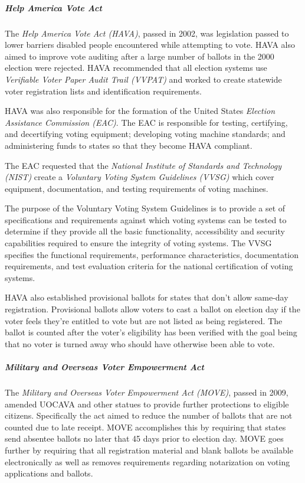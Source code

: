 \subparagraph{Help America Vote Act}
The \emph{Help America Vote Act (HAVA)}, passed in 2002, was legislation passed to
lower barriers disabled people encountered while attempting to vote. HAVA also
aimed to improve vote auditing after a large number of ballots in the 2000
election were rejected. HAVA recommended that all election systems use
\emph{Verifiable Voter Paper Audit Trail (VVPAT)} and worked to create statewide
voter registration lists and identification requirements.

HAVA was also responsible for the formation of the United States \emph{Election
Assistance Commission (EAC)}. The EAC is responsible for testing, certifying,
and decertifying voting equipment; developing voting machine standards; and
administering funds to states so that they become HAVA compliant.

The EAC requested that the \emph{National Institute of Standards and Technology
(NIST)} create a \emph{Voluntary Voting System Guidelines (VVSG)} which cover
equipment, documentation, and testing requirements of voting machines.

\begin{displayquote}
  The purpose of the Voluntary Voting System Guidelines is to provide a set of
  specifications and requirements against which voting systems can be tested to
  determine if they provide all the basic functionality, accessibility and
  security capabilities required to ensure the integrity of voting systems. The
  VVSG specifies the functional requirements, performance characteristics,
  documentation requirements, and test evaluation criteria for the national
  certification of voting systems.
\end{displayquote}

HAVA also established provisional ballots for states that don't allow same-day
registration. Provisional ballots allow voters to cast a ballot on election day
if the voter feels they're entitled to vote but are not listed as being
registered. The ballot is counted after the voter's eligibility has been
verified with the goal being that no voter is turned away who should have
otherwise been able to vote.

\subparagraph{Military and Overseas Voter Empowerment Act}
The \emph{Military and Overseas Voter Empowerment Act (MOVE)}, passed in 2009,
amended UOCAVA and other statues to provide further protections to eligible
citizens. Specifically the act aimed to reduce the number of ballots that are
not counted due to late receipt. MOVE accomplishes this by requiring that states
send absentee ballots no later that 45 days prior to election day. MOVE goes
further by requiring that all registration material and blank ballots be
available electronically as well as removes requirements regarding notarization
on voting applications and ballots.

